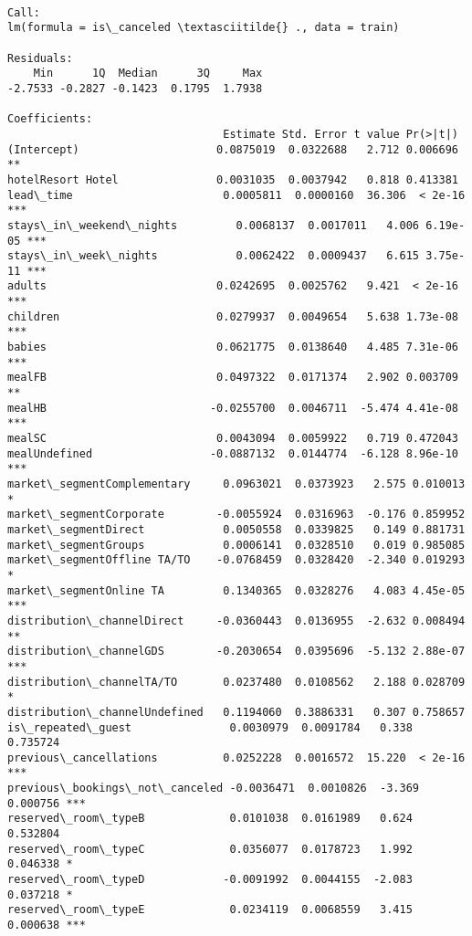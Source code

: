 \documentclass[11pt]{article}
\begin{document}
    
    \begin{Verbatim}[commandchars=\\\{\}]

Call:
lm(formula = is\_canceled \textasciitilde{} ., data = train)

Residuals:
    Min      1Q  Median      3Q     Max 
-2.7533 -0.2827 -0.1423  0.1795  1.7938 

Coefficients:
                                 Estimate Std. Error t value Pr(>|t|)    
(Intercept)                     0.0875019  0.0322688   2.712 0.006696 ** 
hotelResort Hotel               0.0031035  0.0037942   0.818 0.413381    
lead\_time                       0.0005811  0.0000160  36.306  < 2e-16 ***
stays\_in\_weekend\_nights         0.0068137  0.0017011   4.006 6.19e-05 ***
stays\_in\_week\_nights            0.0062422  0.0009437   6.615 3.75e-11 ***
adults                          0.0242695  0.0025762   9.421  < 2e-16 ***
children                        0.0279937  0.0049654   5.638 1.73e-08 ***
babies                          0.0621775  0.0138640   4.485 7.31e-06 ***
mealFB                          0.0497322  0.0171374   2.902 0.003709 ** 
mealHB                         -0.0255700  0.0046711  -5.474 4.41e-08 ***
mealSC                          0.0043094  0.0059922   0.719 0.472043    
mealUndefined                  -0.0887132  0.0144774  -6.128 8.96e-10 ***
market\_segmentComplementary     0.0963021  0.0373923   2.575 0.010013 *  
market\_segmentCorporate        -0.0055924  0.0316963  -0.176 0.859952    
market\_segmentDirect            0.0050558  0.0339825   0.149 0.881731    
market\_segmentGroups            0.0006141  0.0328510   0.019 0.985085    
market\_segmentOffline TA/TO    -0.0768459  0.0328420  -2.340 0.019293 *  
market\_segmentOnline TA         0.1340365  0.0328276   4.083 4.45e-05 ***
distribution\_channelDirect     -0.0360443  0.0136955  -2.632 0.008494 ** 
distribution\_channelGDS        -0.2030654  0.0395696  -5.132 2.88e-07 ***
distribution\_channelTA/TO       0.0237480  0.0108562   2.188 0.028709 *  
distribution\_channelUndefined   0.1194060  0.3886331   0.307 0.758657    
is\_repeated\_guest               0.0030979  0.0091784   0.338 0.735724    
previous\_cancellations          0.0252228  0.0016572  15.220  < 2e-16 ***
previous\_bookings\_not\_canceled -0.0036471  0.0010826  -3.369 0.000756 ***
reserved\_room\_typeB             0.0101038  0.0161989   0.624 0.532804    
reserved\_room\_typeC             0.0356077  0.0178723   1.992 0.046338 *  
reserved\_room\_typeD            -0.0091992  0.0044155  -2.083 0.037218 *  
reserved\_room\_typeE             0.0234119  0.0068559   3.415 0.000638 ***

\end{Verbatim}
\end{document}

